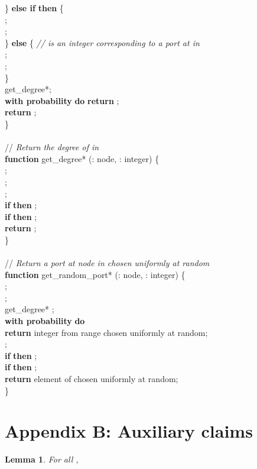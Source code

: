 \documentclass[11pt,a4paper]{article}
\newtheorem{lemma}{Lemma}
\renewcommand{\*}{\hspace*{5mm}}
\begin{document}
\* \} \textbf{else if}  \textbf{then} \{\\
\* \* ;\\
\* \* ;\\
\* \} \textbf{else} \{ \emph{//  is an integer corresponding to a port at  in }\\
\* \* ;\\
\* \* ;\\
\* \}\\
\*  get\_degree*;\\
\* \textbf{with probability} 
 \textbf{do} \textbf{return} ;\\
\* \textbf{return} ;\\
\}\\
\\
// \emph{Return the degree of  in }\\
\textbf{function} get\_degree* (: node, : integer) \{\\
\* ;\\
\* ;\\
\* ;\\
\* \textbf{if}  \textbf{then} ;\\
\* \textbf{if}  \textbf{then} ;\\
\* \textbf{return} ;\\
\}\\
\\
// \emph{Return a port at node  in  chosen uniformly at random}\\
\textbf{function} get\_random\_port* (: node, : integer) \{\\
\* ;\\
\* ;\\
\*  get\_degree* ;\\
\* \textbf{with probability}  \textbf{do}\\
\* \* \textbf{return} integer from range  chosen uniformly at random;\\
\* ;\\
\* \textbf{if}  \textbf{then} ;\\
\* \textbf{if}  \textbf{then} ;\\
\* \textbf{return} element of  chosen uniformly at random;\\
\}\\

\newpage
\section*{Appendix B: Auxiliary claims}


\begin{lemma}\label{lemrev}
For all , 
\end{lemma}
\end{document}
